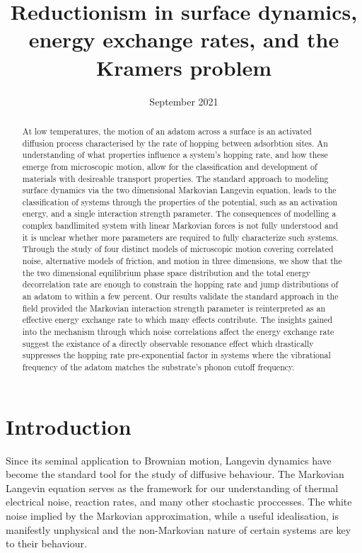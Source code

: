 \documentclass[7pt]{article}
\title{Reductionism in surface dynamics, energy exchange rates, and the Kramers problem}
\date{September 2021}
\begin{document}
\maketitle

\begin{abstract}
	At low temperatures, the motion of an adatom across a surface is an activated diffusion process characterised by the rate of hopping between adsorbtion sites. An understanding of what properties influence a system's hopping rate, and how these emerge from microscopic motion, allow for the classification and development of materials with desireable transport properties. The standard approach to modeling surface dynamics via the two dimensional Markovian Langevin equation, leads to the classification of systems through the properties of the potential, such as an activation energy, and a single interaction strength parameter. The consequences of modelling a complex bandlimited system with linear Markovian forces is not fully understood and it is unclear whether more parameters are required to fully characterize such systems. Through the study of four distinct models of microscopic motion covering correlated noise, alternative models of friction, and motion in three dimensions, we show that the the two dimensional equilibrium phase space distribution and the total energy decorrelation rate are enough to constrain the hopping rate and jump distributions of an adatom to within a few percent. Our results validate the standard approach in the field provided the Markovian interaction strength parameter is reinterpreted as an effective energy exchange rate to which many effects contribute. The insights gained into the mechanism through which noise correlations affect the energy exchange rate suggest the existance of a directly observable resonance effect which drastically suppresses the hopping rate pre-exponential factor in systems where the vibrational frequency of the adatom matches the substrate's phonon cutoff frequency.  

\end{abstract}

\section*{Introduction}

Since its seminal application to Brownian motion\cite{Lemons1997}, Langevin dynamics have become the standard tool for the study of diffusive behaviour. The Markovian Langevin equation serves as the framework for our understanding of thermal electrical noise\cite{Nyquist}, reaction rates\cite{Kramers}, and many other stochastic proccesses. The white noise implied by the Markovian approximation, while a useful idealisation, is manifestly unphysical\cite{Kubo} and the non-Markovian nature of certain systems are key to their behaviour. 
\end{document}
